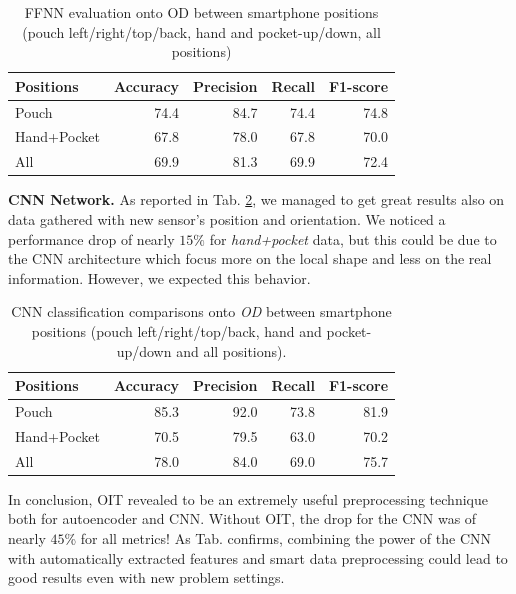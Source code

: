 \begin{table}[h]
  \centering
  \begin{tabular}{lrrrr}
    \hline
    Positions & Accuracy & Precision & Recall & F1-score \\
    \hline
    Pouch & 74.4 & 84.7 & 74.4 & 74.8 \\
    Hand+Pocket & 67.8 & 78.0 & 67.8 & 70.0 \\
    All & 69.9 & 81.3 & 69.9 & 72.4 \\
    \hline
  \end{tabular}
  \caption{FFNN evaluation onto OD between smartphone positions (pouch
    left/right/top/back, hand and pocket-up/down, all positions)}
  \label{tab:ffnn-metrics}
\end{table}

\textbf{CNN Network.}  As reported in
Tab. \ref{tab:model-oit-performance}, we managed to get great results
also on data gathered with new sensor's position and orientation. We
noticed a performance drop of nearly $15\%$ for \textit{hand+pocket}
data, but this could be due to the CNN architecture which focus more
on the local shape and less on the real information. However, we
expected this behavior. 

\begin{table}[h]
  \begin{center}
    \begin{tabular}{p{1.8cm}rrrr}
      \hline
      Positions & Accuracy & Precision & Recall & F1-score \\
      \hline
      Pouch & 85.3 & 92.0 & 73.8 & 81.9 \\
      Hand+Pocket & 70.5 & 79.5 & 63.0 & 70.2 \\
      All & 78.0 & 84.0 & 69.0 & 75.7 \\
      \hline
    \end{tabular}
    \caption{CNN classification comparisons onto \textit{OD} between
      smartphone positions (pouch left/right/top/back, hand and
      pocket-up/down and all positions).}
    \label{tab:model-oit-performance}
  \end{center}
\end{table}

In conclusion, OIT revealed to be an extremely useful preprocessing
technique both for autoencoder and CNN. Without OIT, the drop for the
CNN was of nearly $45$\% for all metrics!  As Tab. confirms, combining
the power of the CNN with automatically extracted features and smart
data preprocessing could lead to good results even with new problem
settings.

